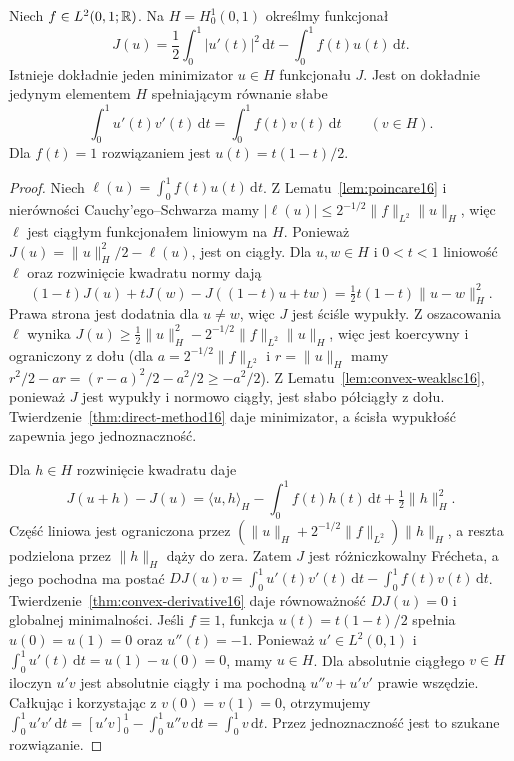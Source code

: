 \begin{twierdzenie}
\label{thm:dirichlet16}
Niech $f\in L^2(0,1;\mathbb R)$. Na $H=H_0^1(0,1)$
określmy funkcjonał
\[
J(u)=\frac12\int_0^1|u'(t)|^2\,\mathrm dt
-\int_0^1 f(t)u(t)\,\mathrm dt.
\]
Istnieje dokładnie jeden minimizator $u\in H$ funkcjonału $J$.
Jest on dokładnie jedynym elementem $H$ spełniającym
równanie słabe
\[
\int_0^1u'(t)v'(t)\,\mathrm dt
=\int_0^1f(t)v(t)\,\mathrm dt\qquad(v\in H).
\]
Dla $f(t)=1$ rozwiązaniem jest $u(t)=t(1-t)/2$.
\end{twierdzenie}
\begin{proof}
Niech $\ell(u)=\int_0^1 f(t)u(t)\,\mathrm dt$.
Z Lematu~\ref{lem:poincare16} i nierówności Cauchy'ego--Schwarza
mamy $|\ell(u)|\le2^{-1/2}\|f\|_{L^2}\|u\|_H$,
więc $\ell$ jest ciągłym funkcjonałem liniowym na $H$.
Ponieważ $J(u)=\|u\|_H^2/2-\ell(u)$, jest on ciągły.
Dla $u,w\in H$ i $0<t<1$ liniowość $\ell$ oraz
rozwinięcie kwadratu normy dają
\[
(1-t)J(u)+tJ(w)-J((1-t)u+tw)
=\tfrac12t(1-t)\|u-w\|_H^2.
\]
Prawa strona jest dodatnia dla $u\ne w$, więc $J$
jest ściśle wypukły. Z oszacowania $\ell$ wynika
$J(u)\ge\frac12\|u\|_H^2-
2^{-1/2}\|f\|_{L^2}\|u\|_H$, więc jest koercywny
i ograniczony z dołu (dla $a=2^{-1/2}\|f\|_{L^2}$
i $r=\|u\|_H$ mamy $r^2/2-ar=(r-a)^2/2-a^2/2\ge-a^2/2$).
Z Lematu~\ref{lem:convex-weaklsc16}, ponieważ $J$ jest
wypukły i normowo ciągły, jest słabo półciągły z dołu.
Twierdzenie~\ref{thm:direct-method16} daje minimizator,
a ścisła wypukłość zapewnia jego jednoznaczność.

Dla $h\in H$ rozwinięcie kwadratu daje
\[
J(u+h)-J(u)=\langle u,h\rangle_H-\int_0^1 f(t)h(t)\,\mathrm dt
+\tfrac12\|h\|_H^2.
\]
Część liniowa jest ograniczona przez
$(\|u\|_H+2^{-1/2}\|f\|_{L^2})\|h\|_H$,
a reszta podzielona przez $\|h\|_H$ dąży do zera.
Zatem $J$ jest różniczkowalny Frécheta, a jego pochodna ma postać
$DJ(u)v=\int_0^1u'(t)v'(t)\,\mathrm dt-
\int_0^1 f(t)v(t)\,\mathrm dt$.
Twierdzenie~\ref{thm:convex-derivative16} daje
równoważność $DJ(u)=0$ i globalnej minimalności.
Jeśli $f\equiv1$, funkcja $u(t)=t(1-t)/2$ spełnia
$u(0)=u(1)=0$ oraz $u''(t)=-1$. Ponieważ $u'\in L^2(0,1)$
i $\int_0^1u'(t)\,\mathrm dt=u(1)-u(0)=0$, mamy $u\in H$.
Dla absolutnie ciągłego $v\in H$ iloczyn $u'v$ jest
absolutnie ciągły i ma pochodną $u''v+u'v'$ prawie wszędzie.
Całkując i korzystając z $v(0)=v(1)=0$, otrzymujemy
$\int_0^1u'v'\,\mathrm dt=[u'v]_0^1-\int_0^1u''v\,\mathrm dt
=\int_0^1v\,\mathrm dt$.
Przez jednoznaczność jest to szukane rozwiązanie.
\end{proof}

